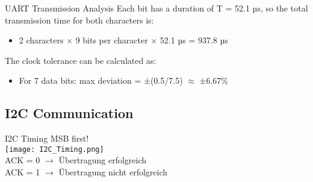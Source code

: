 \begin{example2}{UART Transmission Analysis}
Each bit has a duration of T = 52.1 µs, so the total transmission time for both characters is:
\begin{itemize}
    \item 2 characters × 9 bits per character × 52.1 µs = 937.8 µs
\end{itemize}

The clock tolerance can be calculated as:
\begin{itemize}
    \item For 7 data bits: max deviation = ±(0.5/7.5) $\approx$ ±6.67\%
\end{itemize}
\end{example2}

\subsection{I2C Communication}

\begin{concept}{I2C Timing} MSB first!\\
    \texttt{[image: I2C\_Timing.png]}\\
    ACK = 0 $\rightarrow$ Übertragung erfolgreich\\
    ACK = 1 $\rightarrow$ Übertragung nicht erfolgreich
\end{concept}


